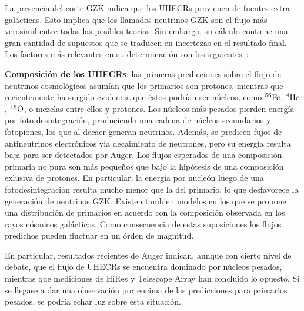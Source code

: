 	La presencia del corte GZK indica que los UHECRs provienen de fuentes extra galácticas.
	Esto implica que los llamados neutrinos GZK son el flujo más verosimil entre todas las posibles teorías. 
	Sin embargo, su cálculo contiene una gran cantidad de supuestos que se traducen en incertezas en el resultado final.
	Los factores m\'as relevantes en su determinaci\'on son los siguientes~\cite{cite:nuEngel,cite:nuAve,cite:nuAhlers1,cite:nuAllard1,cite:nuYuksel}:
	
	\textbf{Composici\'on de los UHECRs}: las primeras predicciones sobre el flujo de neutrinos cosmol\'ogicos asum\'ian que los primarios son protones, mientras que recientemente ha surgido evidencia que éstos podrían ser núcleos, como $^{56}{\rm Fe}$, $^{4}{\rm He}$, $^{16}{\rm O}$, o mezclas entre ellos y protones\cite{cite:nuAve,cite:nuHooper}.
	Los n\'ucleos m\'as pesados pierden energ\'ia por foto-desintegraci\'on, produciendo una cadena de n\'ucleos secundarios y fotopiones, los que al decaer generan neutrinos.
	Adem\'as, se predicen fujos de antineutrinos electr\'onicos via decaimiento de neutrones\cite{cite:nuFeComposition}, pero su energ\'ia resulta baja para ser detectados por Auger.
	Los flujos esperados de una composici\'on primaria no pura son más peque\~nos que bajo la hipótesis de una composici\'on exlusiva de protones\cite{cite:nuHooper}.
	En particular, la energ\'ia por nucle\'on luego de una fotodesintegraci\'on resulta mucho menor que la del primario, lo que desfavorece la generaci\'on de neutrinos GZK.
	Existen tambien modelos en los que se propone una distribuci\'on de primarios en acuerdo con la composici\'on observada en los rayos c\'osmicos gal\'acticos\cite{cite:nuAllard1}.
	Como consecuencia de estas suposiciones los flujos predichos pueden fluctuar en un \'orden de magnitud.
	 
	En particular, resultados recientes de Auger indican, aunque con cierto nivel de debate, que el flujo de UHECRs se encuentra dominado por n\'ucleos pesados\cite{cite:augerComposition}, mientras que mediciones de HiRes y Telescope Array\cite{cite:taComposition} han concluído lo opuesto.
	Si se llegase a dar una observaci\'on por encima de las predicciones para primarios pesados, se podr\'ia echar luz sobre esta situación.
	 
